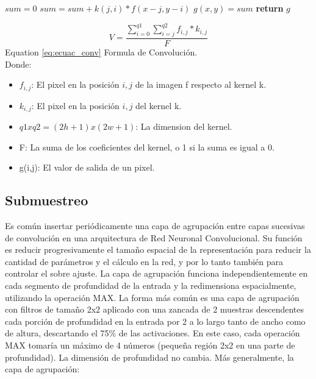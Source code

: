 \begin{itemize}
{\begin{algorithm}
\begin{algorithmic}[H]

  \State $sum=0$
           \State $sum=sum + k(j,i)*f(x-j,y-i)$
		\EndFor
	 \EndFor 
  \State $g(x,y)=sum$
\EndFor
\EndFor
\State \textbf{return} $g$
\EndProcedure
\end{algorithmic}
\end{algorithm}


\begin{equation}\label{eq:ecuac_conv}
V = \frac{\sum^{q1}_{i=0}\sum^{q2}_{i=j} f_{i,j}*k_{i,j}}{F}
\end{equation}
Equation \eqref{eq:ecuac_conv} Formula de Convolución.
\\
Donde:\\
\begin{itemize}
\item $f_{i,j}$: El pixel en la posición $i,j$ de la imagen f respecto al kernel k.
\item $k_{i,j}$: El pixel en la posición $i,j$ del kernel k.
\item $q1xq2 = (2h+1)x(2w+1)$: La dimension del kernel.
\item F: La suma de los coeficientes del kernel, o 1 si la suma es igual a 0.
\item g(i,j): El valor de salida de un pixel.
\end{itemize}}

\end{itemize}


\subsection{Submuestreo}
Es común insertar periódicamente una capa de agrupación entre capas sucesivas
de convolución en una arquitectura de Red Neuronal Convolucional. Su función es
reducir progresivamente el tamaño espacial de la representación para reducir la cantidad
de parámetros y el cálculo en la red, y por lo tanto también para controlar el sobre ajuste.
La capa de agrupación funciona independientemente en cada segmento de profundidad
de la entrada y la redimensiona espacialmente, utilizando la operación MAX. La forma
más común es una capa de agrupación con filtros de tamaño 2x2 aplicado con una zancada
de 2 muestras descendentes cada porción de profundidad en la entrada por 2 a lo largo
tanto de ancho como de altura, descartando el 75\% de las activaciones. En este caso, cada
operación MAX tomaría un máximo de 4 números (pequeña región 2x2 en una parte de
profundidad). La dimensión de profundidad no cambia. Más generalmente, la capa de
agrupación:

